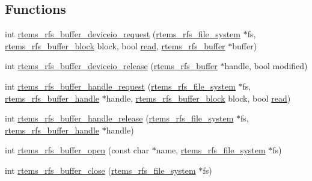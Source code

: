 \subsection*{Functions}
\begin{DoxyCompactItemize}
\item 
int \mbox{\hyperlink{rtems-rfs-buffer_8h_ace9647e355198f86ffd4d637b9ddb900}{rtems\+\_\+rfs\+\_\+buffer\+\_\+deviceio\+\_\+request}} (\mbox{\hyperlink{struct__rtems__rfs__file__system}{rtems\+\_\+rfs\+\_\+file\+\_\+system}} $\ast$fs, \mbox{\hyperlink{rtems-rfs-buffer_8h_a5650d53328a5af0a78198fe780aec043}{rtems\+\_\+rfs\+\_\+buffer\+\_\+block}} block, bool \mbox{\hyperlink{libcsupport_2src_2read_8c_a26d4711c05afec4c7771c3d17b2db9e9}{read}}, \mbox{\hyperlink{struct__rtems__rfs__buffer}{rtems\+\_\+rfs\+\_\+buffer}} $\ast$buffer)
\item 
int \mbox{\hyperlink{rtems-rfs-buffer_8h_a93fca5a06bf0618e3ced9c3f1d167178}{rtems\+\_\+rfs\+\_\+buffer\+\_\+deviceio\+\_\+release}} (\mbox{\hyperlink{struct__rtems__rfs__buffer}{rtems\+\_\+rfs\+\_\+buffer}} $\ast$handle, bool modified)
\item 
int \mbox{\hyperlink{rtems-rfs-buffer_8h_a0663516c5bc4844f8b6f47ebb9705dea}{rtems\+\_\+rfs\+\_\+buffer\+\_\+handle\+\_\+request}} (\mbox{\hyperlink{struct__rtems__rfs__file__system}{rtems\+\_\+rfs\+\_\+file\+\_\+system}} $\ast$fs, \mbox{\hyperlink{rtems-rfs-buffer_8h_a17f97c37c5273ad28d413dfd2d175e23}{rtems\+\_\+rfs\+\_\+buffer\+\_\+handle}} $\ast$handle, \mbox{\hyperlink{rtems-rfs-buffer_8h_a5650d53328a5af0a78198fe780aec043}{rtems\+\_\+rfs\+\_\+buffer\+\_\+block}} block, bool \mbox{\hyperlink{libcsupport_2src_2read_8c_a26d4711c05afec4c7771c3d17b2db9e9}{read}})
\item 
int \mbox{\hyperlink{rtems-rfs-buffer_8h_ab50227fce5883f922c86d14e0e558270}{rtems\+\_\+rfs\+\_\+buffer\+\_\+handle\+\_\+release}} (\mbox{\hyperlink{struct__rtems__rfs__file__system}{rtems\+\_\+rfs\+\_\+file\+\_\+system}} $\ast$fs, \mbox{\hyperlink{rtems-rfs-buffer_8h_a17f97c37c5273ad28d413dfd2d175e23}{rtems\+\_\+rfs\+\_\+buffer\+\_\+handle}} $\ast$handle)
\item 
int \mbox{\hyperlink{rtems-rfs-buffer_8h_af8b9acf77d20824a7121b89ab7b29bf9}{rtems\+\_\+rfs\+\_\+buffer\+\_\+open}} (const char $\ast$name, \mbox{\hyperlink{struct__rtems__rfs__file__system}{rtems\+\_\+rfs\+\_\+file\+\_\+system}} $\ast$fs)
\item 
int \mbox{\hyperlink{rtems-rfs-buffer_8h_ae5b347848c87353252dde82820821b05}{rtems\+\_\+rfs\+\_\+buffer\+\_\+close}} (\mbox{\hyperlink{struct__rtems__rfs__file__system}{rtems\+\_\+rfs\+\_\+file\+\_\+system}} $\ast$fs)

\end{DoxyCompactItemize}

